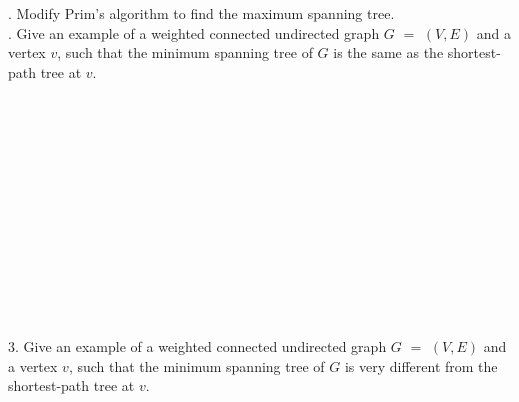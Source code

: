 \documentclass[12pt]{article}
\begin{document}
  . Modify Prim's algorithm to find the maximum spanning tree.\\
\newpage
{}. Give an example of a weighted connected undirected graph $G$ $=$ $(V,E)$ and a vertex $v$, such that the 
minimum spanning tree of $G$ is the same as the shortest-path tree at $v$.\\\\\\\\\\\\\\\\\\\\\\\\\\\\
3. Give an example of a weighted connected undirected graph $G$ $=$ $(V,E)$ and a vertex $v$, such that the 
minimum spanning tree of $G$ is very different from the shortest-path tree at $v$.\\\\\\\\\\\\\\\\\\\\\\\\\\\\
\end{document}
